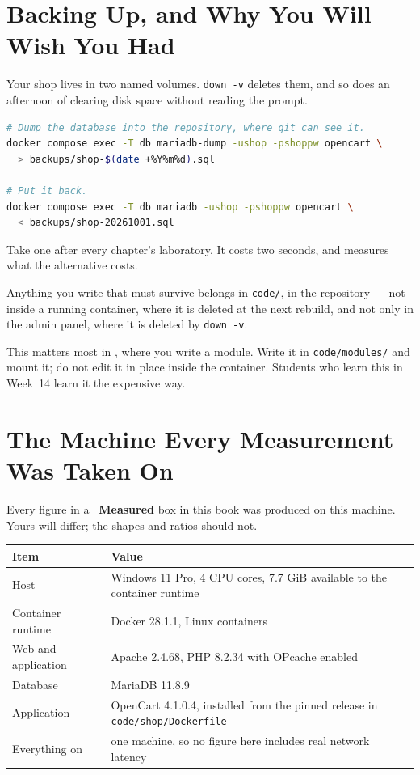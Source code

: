 \section{Backing Up, and Why You Will Wish You Had}

Your shop lives in two named volumes. \texttt{down -v} deletes them, and so
does an afternoon of clearing disk space without reading the prompt.

\begin{lstlisting}[language=bash]
# Dump the database into the repository, where git can see it.
docker compose exec -T db mariadb-dump -ushop -pshoppw opencart \
  > backups/shop-$(date +%Y%m%d).sql

# Put it back.
docker compose exec -T db mariadb -ushop -pshoppw opencart \
  < backups/shop-20261001.sql
\end{lstlisting}

Take one after every chapter's laboratory. It costs two seconds, and
 measures what the alternative costs.

\begin{alertbox}
Anything you write that must survive belongs in \texttt{code/}, in the
repository --- not inside a running container, where it is deleted at the next
rebuild, and not only in the admin panel, where it is deleted by
\texttt{down -v}.

\smallskip
This matters most in , where you write a module. Write it in
\texttt{code/modules/} and mount it; do not edit it in place inside the
container. Students who learn this in Week~14 learn it the expensive way.
\end{alertbox}

\section{The Machine Every Measurement Was Taken On}

Every figure in a ~\textbf{Measured} box in this book was
produced on this machine. Yours will differ; the shapes and ratios should not.

\rowcolors{2}{white}{lightbg}
\begin{longtable}{@{}L{4.6cm}L{10.4cm}@{}}
\toprule
{}
\textbf{Item} & \textbf{Value} \\
\midrule
\endhead
Host & Windows 11 Pro, 4 CPU cores, 7.7 GiB available to the container
runtime \\
Container runtime & Docker 28.1.1, Linux containers \\
Web and application & Apache 2.4.68, PHP 8.2.34 with OPcache enabled \\
Database & MariaDB 11.8.9 \\
Application & OpenCart 4.1.0.4, installed from the pinned release in
\texttt{code/shop/Dockerfile} \\
Everything on & one machine, so no figure here includes real network latency \\
\bottomrule
\end{longtable}

